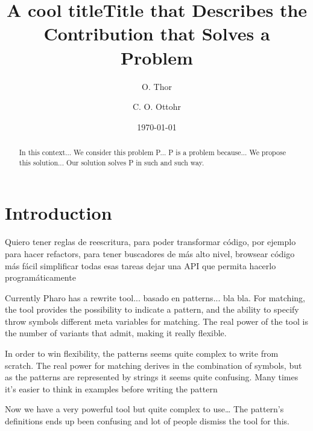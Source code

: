 \documentclass{article}
\begin{document}
\title{A cool title}
\maketitle


\title{Title that Describes the Contribution that Solves a Problem}
\author{O. Thor \and C. O. Ottohr}
\date{\today}
\maketitle

\begin{abstract}
In this context...
We consider this problem P...
P is a problem because...
We propose this solution...
Our solution solves P in such and such way.
\end{abstract}


\section{Introduction}
\label{sec:intro}


Quiero tener reglas de reescritura, para poder transformar código, 
por ejemplo para hacer refactors, para tener buscadores de más alto nivel, browsear código más fácil
simplificar todas esas tareas
dejar una API que permita hacerlo programáticamente

\medskip 


Currently Pharo has a rewrite tool... basado en patterns... bla bla.
For matching, the tool provides the possibility to indicate a pattern, and the ability to specify throw symbols different meta variables for matching.
The real power of the tool is the number of variants that admit, making it really flexible.

In order to win flexibility, the patterns seems quite complex to write from scratch.
The real power for matching derives in the combination of symbols, but as the patterns are represented by strings it seems quite confusing.
Many times it’s easier to think in examples before writing the pattern

Now we have a very powerful tool but quite complex to use… The pattern’s definitions ends up been confusing and lot of people dismiss the tool for this.
\end{document}
